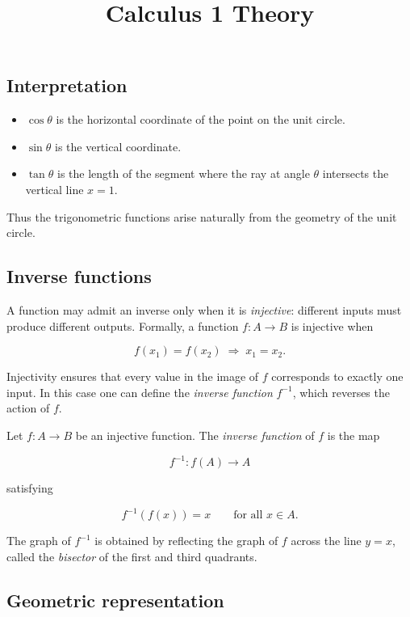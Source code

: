 \documentclass[11pt,a4paper]{article} \usepackage[T1]{fontenc}
\theoremstyle{plain} \newtheorem{theorem}{Theorem} \title{Calculus 1 Theory}
\begin{document}
\subsection*{Interpretation}

\begin{itemize}
\item $\cos\theta$ is the horizontal coordinate of the point on the unit
circle.
\item $\sin\theta$ is the vertical coordinate.
\item $\tan\theta$ is the length of the segment where the ray at angle $\theta$
intersects the vertical line $x=1$.
\end{itemize}

Thus the trigonometric functions arise naturally from the geometry of the unit
circle.

\subsection{Inverse functions}

A function may admit an inverse only when it is \emph{injective}: different
inputs must produce different outputs. Formally, a function $f : A \to B$ is
injective when

\[
f(x_1)=f(x_2) \;\Rightarrow\; x_1=x_2.
\]

Injectivity ensures that every value in the image of $f$ corresponds to exactly
one input. In this case one can define the \emph{inverse function} $f^{-1}$,
which reverses the action of $f$.

\begin{definition}
 Let $f : A \to B$ be an injective function. The
\emph{inverse function} of $f$ is the map

\[
f^{-1} : f(A) \to A
\]

satisfying

\[
f^{-1}(f(x)) = x \qquad \text{for all } x\in A.
\]

\end{definition}

The graph of $f^{-1}$ is obtained by reflecting the graph of $f$ across the
line $y=x$, called the \emph{bisector} of the first and third quadrants.

\subsection*{Geometric representation}
\end{document}
